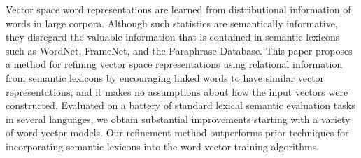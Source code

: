 Vector space word representations are learned from distributional information of words in large corpora. Although such statistics are semantically informative, they disregard the valuable information that is contained in semantic lexicons such as WordNet, FrameNet, and the Paraphrase Database. This paper proposes a method for refining vector space representations using relational information from semantic lexicons by encouraging linked words to have similar vector representations, and it makes no assumptions about how the input vectors were constructed. Evaluated on a battery of standard lexical semantic evaluation tasks in several languages, we obtain substantial improvements starting with a variety of word vector models. Our refinement method outperforms prior techniques for incorporating semantic lexicons into the word vector training algorithms.
